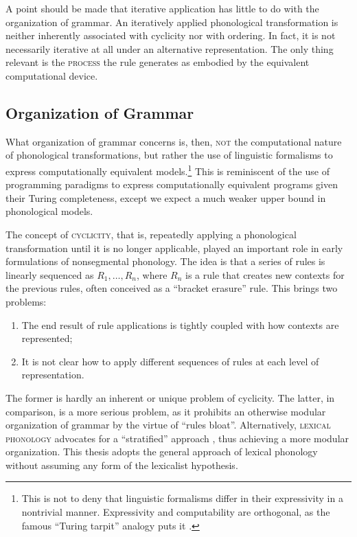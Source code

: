 \documentclass[12pt, a4paper]{report}
\newcommand{\textemph}[1]{\textsc{#1}}
\newcommand{\textterm}[1]{\textsc{#1}\index{#1}}
\begin{document}
A point should be made that iterative application has little to do
with the organization of grammar.  An iteratively applied phonological
transformation is neither inherently associated with cyclicity nor
with ordering.  In fact, it is not necessarily iterative at all under
an alternative representation.  The only thing relevant is the
\textemph{process} the rule generates as embodied by the equivalent
computational device.

\subsection{Organization of Grammar}
What organization of grammar concerns is, then, \textemph{not} the
computational nature of phonological transformations, but rather the
use of linguistic formalisms to express computationally equivalent
models.\footnote{This is not to deny that linguistic formalisms differ
  in their expressivity in a nontrivial manner.  Expressivity and
  computability are orthogonal, as the famous \enquote{Turing tarpit}
  analogy puts it \parencite{p82ep}.}  This is reminiscent of the use
of programming paradigms to express computationally equivalent
programs given their Turing completeness, except we expect a much
weaker upper bound in phonological models.

The concept of \textterm{cyclicity}, that is, repeatedly applying a
phonological transformation until it is no longer applicable, played
an important role in early formulations of nonsegmental phonology.
The idea is that a series of rules is linearly sequenced as
\(R_{1}, \ldots, R_{n}\), where \(R_{n}\) is a rule that creates new
contexts for the previous rules, often conceived as a \enquote{bracket
  erasure} rule.  This brings two problems:
%
\begin{enumerate}
\item The end result of rule applications is tightly coupled with how
  contexts are represented;
\item It is not clear how to apply different sequences of rules at
  each level of representation.
\end{enumerate}
%
The former is hardly an inherent or unique problem of cyclicity.  The
latter, in comparison, is a more serious problem, as it prohibits an
otherwise modular organization of grammar by the virtue of
\enquote{rules bloat}.  Alternatively, \textterm{lexical phonology}
advocates for a \enquote{stratified} approach \parencite{k82cplp},
thus achieving a more modular organization.  This thesis adopts the
general approach of lexical phonology without assuming any form of the
lexicalist hypothesis.
\end{document}
